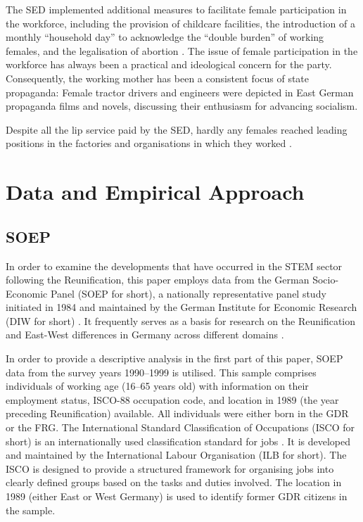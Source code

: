 \documentclass[a4paper, oneside, hyperfootnotes = false]{article}
\begin{document}
{%
The SED implemented additional measures to facilitate female participation in the workforce, including the provision of childcare facilities, the introduction of a monthly ``household day'' to acknowledge the ``double burden'' of working females, and the legalisation of abortion \citep{Budde1999}.
The issue of female participation in the workforce has always been a practical and ideological concern for the party.
Consequently, the working mother has been a consistent focus of state propaganda:
Female tractor drivers and engineers were depicted in East German propaganda films and novels, discussing their enthusiasm for advancing socialism.

Despite all the lip service paid by the SED, hardly any females reached leading positions in the factories and organisations in which they worked \citep{Ross2017, Frauenreport1990}.

\section{Data and Empirical Approach}
\label{dataemp}

\subsection{SOEP}
\label{gsoep}

In order to examine the developments that have occurred in the STEM sector following the Reunification, this paper employs data from the German Socio-Economic Panel (SOEP for short), a nationally representative panel study initiated in 1984 and maintained by the German Institute for Economic Research (DIW for short) \citep{Siegers2022}.
It frequently serves as a basis for research on the Reunification and East-West differences in Germany across different domains \citep{Petrunyk2016, Bird1994, Hadjar2010}.

In order to provide a descriptive analysis in the first part of this paper, SOEP data from the survey years 1990--1999 is utilised.
This sample comprises individuals of working age (16--65 years old) with information on their employment status, ISCO-88 occupation code, and location in 1989 (the year preceding Reunification) available.
All individuals were either born in the GDR or the FRG.
The International Standard Classification of Occupations (ISCO for short) is an internationally used classification standard for jobs \citep{Elias1997}.
It is developed and maintained by the International Labour Organisation (ILB for short).
The ISCO is designed to provide a structured framework for organising jobs into clearly defined groups based on the tasks and duties involved.
The location in 1989 (either East or West Germany) is used to identify former GDR citizens in the sample.

}
\end{document}
